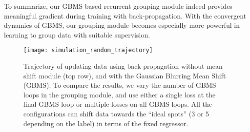 To summarize,
our GBMS based recurrent grouping module indeed provides meaningful gradient during training with back-propagation.
With the convergent dynamics of GBMS,
our grouping module becomes especially more powerful in learning to group data with suitable supervision.





\begin{figure*}[t]
\centering
   \texttt{[image: simulation\_random\_trajectory]}%
   \caption{
   Trajectory of updating data using back-propagation without mean shift module (top row),
   and with the Gaussian Blurring Mean Shift (GBMS).
   To compare the results,
   we vary the number of GBMS loops in the grouping module,
   and use either a single loss at the final GBMS loop or multiple losses on all GBMS loops.
   All the configurations can shift data towards the ``ideal spots'' (3 or 5 depending on the label) in terms of the fixed regressor.
   }
\label{fig:simulation_trajectory}
\end{figure*}

